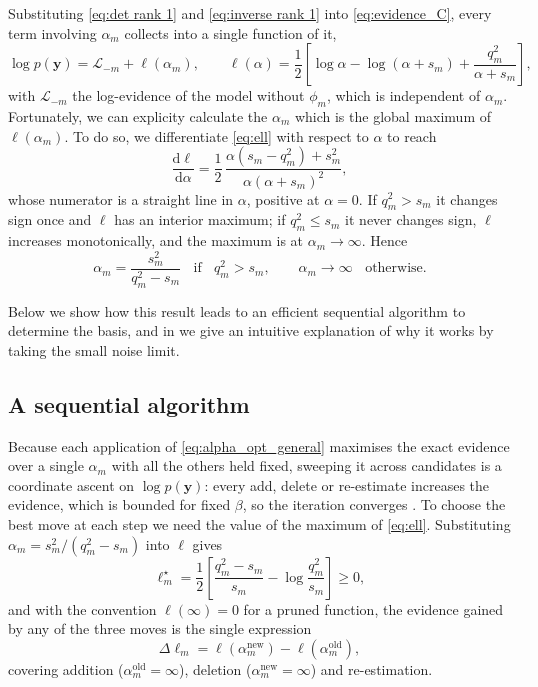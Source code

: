 \documentclass[a4paper]{article}
\begin{document}
Substituting \eqref{eq:det rank 1} and \eqref{eq:inverse rank 1} into \eqref{eq:evidence_C}, every term involving $\alpha_m$ collects into a single function of it,
\begin{equation} \label{eq:ell}
    \log p(\mathbf y) = \mathcal L_{-m} + \ell(\alpha_m),
    \qquad
    \ell(\alpha) = \frac{1}{2} \left[ \log \alpha - \log (\alpha + s_m) + \frac{q_m^2}{\alpha + s_m} \right],
\end{equation}
with $\mathcal L_{-m}$ the log-evidence of the model without $\phi_m$, which is independent of $\alpha_m$. Fortunately, we can explicity calculate the $\alpha_m$ which is the global maximum of $\ell(\alpha_m)$. To do so, we differentiate \eqref{eq:ell} with respect to $\alpha$ to reach
\begin{equation}
    \frac{\mathrm d \ell}{\mathrm d \alpha} = \frac{1}{2} \, \frac{\alpha (s_m - q_m^2) + s_m^2}{\alpha (\alpha + s_m)^2},
\end{equation}
whose numerator is a straight line in $\alpha$, positive at $\alpha = 0$. If $q_m^2 > s_m$ it changes sign once and $\ell$ has an interior maximum; if $q_m^2 \leq s_m$ it never changes sign, $\ell$ increases monotonically, and the maximum is at $\alpha_m \to \infty$. Hence
\begin{equation} \label{eq:alpha_opt_general}
    \alpha_m = \frac{s_m^2}{q_m^2 - s_m} \;\; \text{ if } \;\; q_m^2 > s_m,
    \qquad \alpha_m \to \infty \;\; \text{ otherwise.}
\end{equation}

Below we show how this result leads to an efficient sequential algorithm to determine the basis, and in  we give an intuitive explanation of why it works by taking the small noise limit.

\subsection{A sequential algorithm}

Because each application of \eqref{eq:alpha_opt_general} maximises the exact evidence over a single $\alpha_m$ with all the others held fixed, sweeping it across candidates is a coordinate ascent on $\log p(\mathbf y)$: every add, delete or re-estimate increases the evidence, which is bounded for fixed $\beta$, so the iteration converges \autocite{tipping2003fast}. To choose the best move at each step we need the value of the maximum of \eqref{eq:ell}. Substituting $\alpha_m = s_m^2/(q_m^2 - s_m)$ into $\ell$ gives
\begin{equation} \label{eq:ell_max}
    \ell_m^\star = \frac{1}{2} \left[ \frac{q_m^2 - s_m}{s_m} - \log \frac{q_m^2}{s_m} \right] \geq 0,
\end{equation}
and with the convention $\ell(\infty) = 0$ for a pruned function, the evidence gained by any of the three moves is the single expression
\begin{equation} \label{eq:delta_ell}
    \Delta \ell_m = \ell(\alpha_m^{\mathrm{new}}) - \ell(\alpha_m^{\mathrm{old}}),
\end{equation}
covering addition ($\alpha_m^{\mathrm{old}} = \infty$), deletion ($\alpha_m^{\mathrm{new}} = \infty$) and re-estimation.
\end{document}
